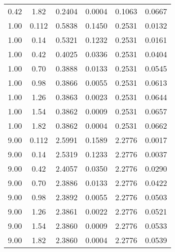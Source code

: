\documentclass{article}[11pt]
\begin{document}
\begin{table}[h]
\begin{tabular}{cc|cccc}
0.42 & 1.82 & 0.2404 & 0.0004 & 0.1063 & 0.0667 \\
1.00 & 0.112 & 0.5838 & 0.1450 & 0.2531 & 0.0132 \\
1.00 & 0.14 & 0.5321 & 0.1232 & 0.2531 & 0.0161 \\
1.00 & 0.42 & 0.4025 & 0.0336 & 0.2531 & 0.0404 \\
1.00 & 0.70 & 0.3888 & 0.0133 & 0.2531 & 0.0545 \\
1.00 & 0.98 & 0.3866 & 0.0055 & 0.2531 & 0.0613 \\
1.00 & 1.26 & 0.3863 & 0.0023 & 0.2531 & 0.0644 \\
1.00 & 1.54 & 0.3862 & 0.0009 & 0.2531 & 0.0657 \\
1.00 & 1.82 & 0.3862 & 0.0004 & 0.2531 & 0.0662 \\
9.00 & 0.112 & 2.5991 & 0.1589 & 2.2776 & 0.0017 \\
9.00 & 0.14 & 2.5319 & 0.1233 & 2.2776 & 0.0037 \\
9.00 & 0.42 & 2.4057 & 0.0350 & 2.2776 & 0.0290 \\
9.00 & 0.70 & 2.3886 & 0.0133 & 2.2776 & 0.0422 \\
9.00 & 0.98 & 2.3892 & 0.0055 & 2.2776 & 0.0503 \\
9.00 & 1.26 & 2.3861 & 0.0022 & 2.2776 & 0.0521 \\
9.00 & 1.54 & 2.3860 & 0.0009 & 2.2776 & 0.0533 \\
9.00 & 1.82 & 2.3860 & 0.0004 & 2.2776 & 0.0539 \\ \toprule
\end{tabular}
\label{tab:captab-sky130-m1}
\end{table}
\end{document}
